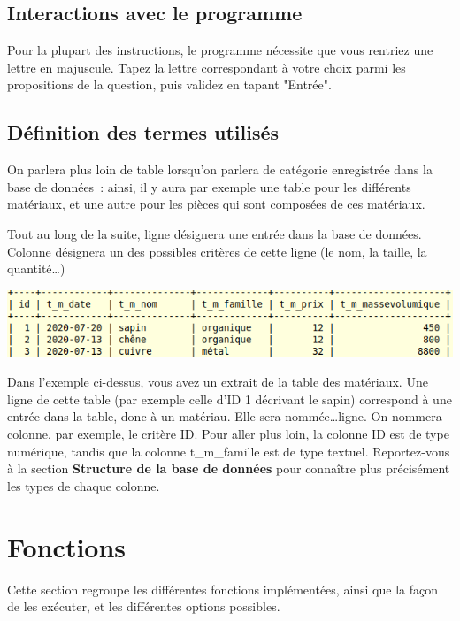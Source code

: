 \documentclass[12pt,a4paper]{article}
\begin{document}
\bigskip
\subsection{Interactions avec le programme}
    Pour la plupart des instructions, le programme nécessite que vous rentriez une lettre en majuscule.
    Tapez la lettre correspondant à votre choix parmi les propositions de la question,
    puis validez en tapant "Entrée".


\bigskip    
\subsection{Définition des termes utilisés}
    On parlera plus loin de table lorsqu'on parlera de catégorie enregistrée dans la base de données :
    ainsi, il y aura par exemple une table pour les différents matériaux, et une autre pour les pièces
    qui sont composées de ces matériaux.

    Tout au long de la suite, ligne désignera une entrée dans la base de données.
    Colonne désignera un des possibles critères de cette ligne (le nom, la taille, la quantité\dots)
    
    \includegraphics{exemple_lignes_colonnes.png}

    Dans l'exemple ci-dessus, vous avez un extrait de la table des matériaux.
    Une ligne de cette table (par exemple celle d'ID 1 décrivant le sapin) correspond à une entrée
    dans la table, donc à un matériau. Elle sera nommée\dots ligne.
    On nommera colonne, par exemple, le critère ID. Pour aller plus loin, la colonne ID
    est de type numérique, tandis que la colonne t\_m\_famille est de type textuel.
    Reportez-vous à la section \textbf{Structure de la base de données} pour connaître plus précisément
    les types de chaque colonne.



\clearpage
\section{Fonctions}

Cette section regroupe les différentes fonctions implémentées, ainsi que la façon de les exécuter, et les différentes options possibles.
\end{document}
